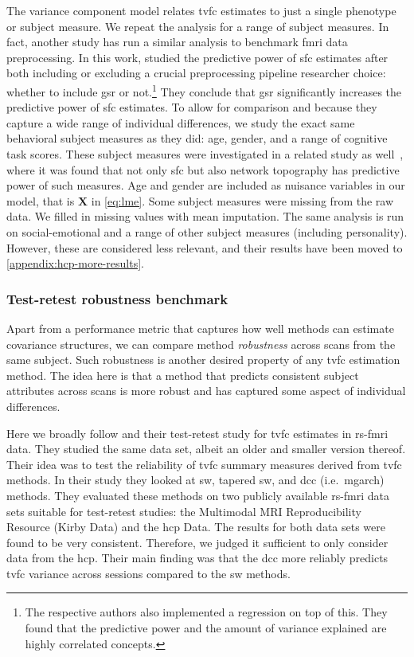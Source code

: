 The variance component model relates \gls{tvfc} estimates to just a single phenotype or subject measure.
We repeat the analysis for a range of subject measures.
%
In fact, another study has run a similar analysis to benchmark \gls{fmri} data preprocessing.
In this work, \textcite{Li2019a} studied the predictive power of \gls{sfc} estimates after both including or excluding a crucial preprocessing pipeline researcher choice: whether to include \gls{gsr} or not.\footnote{The respective authors also implemented a regression on top of this. They found that the predictive power and the amount of variance explained are highly correlated concepts.}
They conclude that \gls{gsr} significantly increases the predictive power of \gls{sfc} estimates.
To allow for comparison and because they capture a wide range of individual differences, we study the exact same behavioral subject measures as they did: age, gender, and a range of cognitive task scores.
These subject measures were investigated in a related study as well~\parencite{Kong2019}, where it was found that not only \gls{sfc} but also network topography has predictive power of such measures.
%
Age and gender are included as nuisance variables in our model, that is $\mathbf{X}$ in \cref{eq:lme}.
Some subject measures were missing from the raw data.
We filled in missing values with mean imputation.
%
The same analysis is run on social-emotional and a range of other subject measures (including personality).
However, these are considered less relevant, and their results have been moved to \cref{appendix:hcp-more-results}.

\subsubsection{Test-retest robustness benchmark}

Apart from a performance metric that captures how well methods can estimate covariance structures, we can compare method \emph{robustness} across scans from the same subject.
Such robustness is another desired property of any \gls{tvfc} estimation method.
The idea here is that a method that predicts consistent subject attributes across scans is more robust and has captured some aspect of individual differences.

Here we broadly follow \textcite{Choe2017} and their test-retest study for \gls{tvfc} estimates in \gls{rs-fmri} data.
They studied the same data set, albeit an older and smaller version thereof.
%
Their idea was to test the reliability of \gls{tvfc} summary measures derived from \gls{tvfc} methods.
In their study they looked at \gls{sw}, tapered \gls{sw}, and \gls{dcc} (i.e.~\gls{mgarch}) methods.
They evaluated these methods on two publicly available \gls{rs-fmri} data sets suitable for test-retest studies: the Multimodal MRI Reproducibility Resource (Kirby Data) and the \gls{hcp} Data.
The results for both data sets were found to be very consistent.
Therefore, we judged it sufficient to only consider data from the \gls{hcp}.
Their main finding was that the \gls{dcc} more reliably predicts \gls{tvfc} variance across sessions compared to the \gls{sw} methods.

